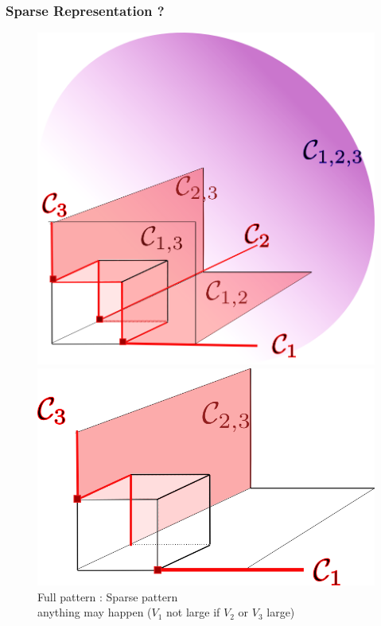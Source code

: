 \documentclass[9pt]{beamer}
\begin{document}
\begin{frame}
\frametitle{Sparse Representation ?}
  \begin{figure}
    \centering
    \includegraphics[width=0.4\linewidth]{sourcefigs/3D_anyH}\qquad 
    \includegraphics[width=0.4\linewidth]{sourcefigs/3D_sparseH} \\

 Full pattern : 
\hspace{3cm}   Sparse pattern  \\
{\footnotesize anything may happen}  \hspace{2cm} {\footnotesize ($V_1$ not large if
 $V_2$ or $V_3$ large)}
  \end{figure}
\end{frame}


\end{document}
